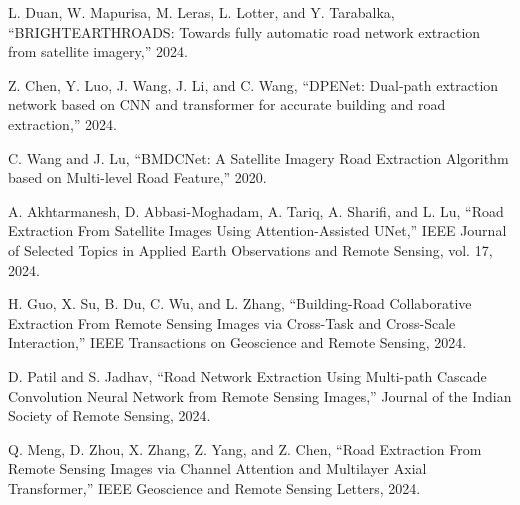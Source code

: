 \documentclass[conference]{IEEEtran}
\begin{document}
\begin{thebibliography}{99}
L. Duan, W. Mapurisa, M. Leras, L. Lotter, and Y. Tarabalka, “BRIGHTEARTHROADS: Towards fully automatic road network extraction from satellite imagery,” 2024.

Z. Chen, Y. Luo, J. Wang, J. Li, and C. Wang, “DPENet: Dual-path extraction network based on CNN and transformer for accurate building and road extraction,” 2024.

C. Wang and J. Lu, “BMDCNet: A Satellite Imagery Road Extraction Algorithm based on Multi-level Road Feature,” 2020.

A. Akhtarmanesh, D. Abbasi-Moghadam, A. Tariq, A. Sharifi, and L. Lu, “Road Extraction From Satellite Images Using Attention-Assisted UNet,” IEEE Journal of Selected Topics in Applied Earth Observations and Remote Sensing, vol. 17, 2024.

H. Guo, X. Su, B. Du, C. Wu, and L. Zhang, “Building-Road Collaborative Extraction From Remote Sensing Images via Cross-Task and Cross-Scale Interaction,” IEEE Transactions on Geoscience and Remote Sensing, 2024.

D. Patil and S. Jadhav, “Road Network Extraction Using Multi-path Cascade Convolution Neural Network from Remote Sensing Images,” Journal of the Indian Society of Remote Sensing, 2024.

Q. Meng, D. Zhou, X. Zhang, Z. Yang, and Z. Chen, “Road Extraction From Remote Sensing Images via Channel Attention and Multilayer Axial Transformer,” IEEE Geoscience and Remote Sensing Letters, 2024.

\end{thebibliography}
\end{document}
